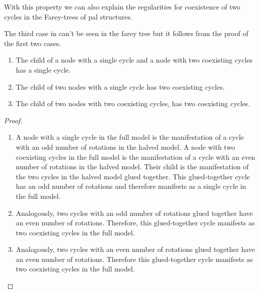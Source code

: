 
With this property we can also explain the regularities for coexistence of two cycles in the Farey-trees of \gls{pal} structures.

The third case in  can't be seen in the farey tree but it follows from the proof of the first two cases.

\begin{theorem}
	\label{theorem:child.coexistence}
	\begin{enumerate}
		\item The child of a node with a single cycle and a node with two coexisting cycles has a single cycle.
		\item The child of two nodes with a single cycle has two coexisting cycles.
		\item The child of two nodes with two coexisting cycles, has two coexisting cycles.
	\end{enumerate}
\end{theorem}

\begin{proof} \phantom{x}
	\begin{enumerate}
		\item A node with a single cycle in the full model is the manifestation of a cycle with an odd number of rotations in the halved model.
		      A node with two coexisting cycles in the full model is the manifestation of a cycle with an even number of rotations in the halved model.
		      Their child is the manifestation of the two cycles in the halved model glued together.
		      This glued-together cycle has an odd number of rotations and therefore manifests as a single cycle in the full model.
		\item Analogously, two cycles with an odd number of rotations glued together have an even number of rotations.
		      Therefore, this glued-together cycle manifests as two coexisting cycles in the full model.
		\item Analogously, two cycles with an even number of rotations glued together have an even number of rotations.
		      Therefore this glued-together cycle manifests as two coexisting cycles in the full model.
	\end{enumerate}
\end{proof}


